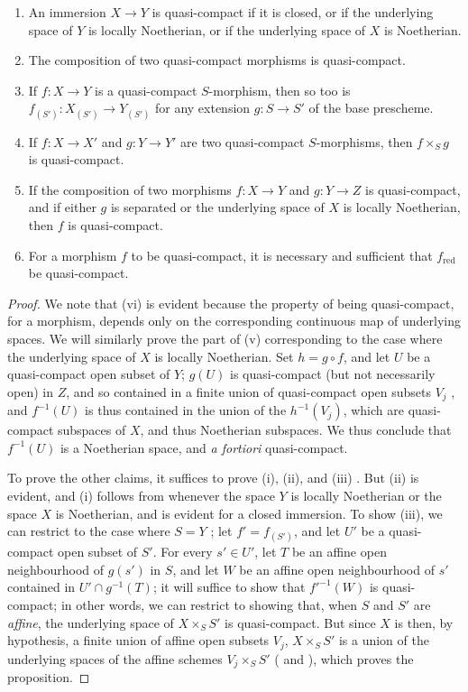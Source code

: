 \begin{prop}[6.6.4]
\label{1.6.6.4}
\begin{enumerate}[label=\emph{(\alph*)}]
    \item An immersion $X\to Y$ is quasi-compact if it is closed, or if the underlying space of $Y$ is locally Noetherian, or if the underlying space of $X$ is Noetherian.
    \item The composition of two quasi-compact morphisms is quasi-compact.
    \item If $f: X\to Y$ is a quasi-compact $S$-morphism, then so too is $f_{(S')}: X_{(S')}\to Y_{(S')}$ for any extension $g: S\to S'$ of the base prescheme.
    \item If $f:X\to X'$ and $g:Y\to Y'$ are two quasi-compact $S$-morphisms, then $f\times_S g$ is quasi-compact.
    \item If the composition of two morphisms $f: X\to Y$ and $g:Y\to Z$ is quasi-compact, and if either $g$ is separated or the underlying space of $X$ is locally Noetherian, then $f$ is quasi-compact.
    \item For a morphism $f$ to be quasi-compact, it is necessary and sufficient that $f_\mathrm{red}$ be quasi-compact.
\end{enumerate}
\end{prop}

\begin{proof}
\label{proof-1.6.6.4}
We note that (vi) is evident because the property of being quasi-compact, for a morphism, depends only on the corresponding continuous map of underlying spaces.
We will similarly prove the part of (v) corresponding to the case where the underlying space of $X$ is locally Noetherian.
Set $h=g\circ f$, and let $U$ be a quasi-compact open subset of $Y$;
$g(U)$ is quasi-compact (but not necessarily open) in $Z$, and so contained in a finite union of quasi-compact open subsets $V_j$ , and $f^{-1}(U)$ is thus contained in the union of the $h^{-1}(V_j)$, which are quasi-compact subspaces of $X$, and thus Noetherian subspaces.
We thus conclude  that $f^{-1}(U)$ is a Noetherian space, and \emph{a fortiori} quasi-compact.

To prove the other claims, it suffices to prove (i), (ii), and (iii) .
But (ii) is evident, and (i) follows from  whenever the space $Y$ is locally Noetherian or the space $X$ is Noetherian, and is evident for a closed immersion.
To show (iii), we can restrict to the case where $S=Y$ ;
let $f'=f_{(S')}$, and let $U'$ be a quasi-compact open subset of $S'$.
For every $s'\in U'$, let $T$ be an affine open neighbourhood of $g(s')$ in $S$, and let $W$ be an affine open neighbourhood of $s'$ contained in $U'\cap g^{-1}(T)$;
it will suffice to show that $f'^{-1}(W)$ is quasi-compact;
in other words, we can restrict to showing that, when $S$ and $S'$ are \emph{affine}, the underlying space of $X\times_S S'$ is quasi-compact.
But since $X$ is then, by hypothesis, a finite union of affine open subsets $V_j$, $X\times_S S'$ is a union of the underlying spaces of the affine schemes $V_j\times_S S'$ ( and ), which proves the proposition.
\end{proof}

